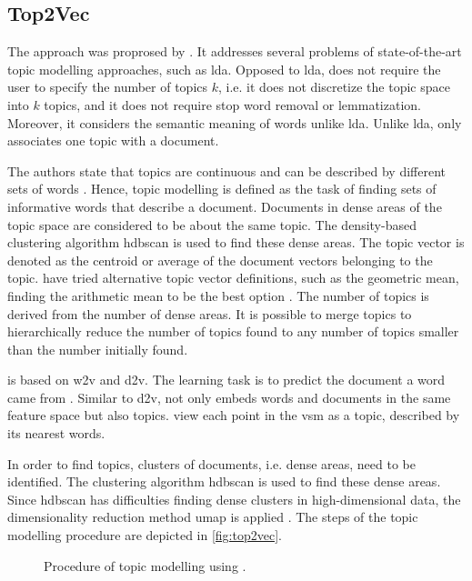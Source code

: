 \subsection{Top2Vec}\label{subsec:top2vec}

The approach \topTwovec{} was proprosed by \citeauthor{Top2Vec2020} \cite{Top2Vec2020}.
It addresses several problems of state-of-the-art topic modelling approaches, such as \ac{lda}.
Opposed to \ac{lda}, \topTwovec{} does not require the user to specify the number of topics $k$, 
i.e. it does not discretize the topic space into $k$ topics, 
and it does not require stop word removal or lemmatization.
Moreover, it considers the semantic meaning of words unlike \ac{lda}.
Unlike \ac{lda}, \topTwovec{} only associates one topic with a document.

The authors state that topics are continuous and can be described by different sets of words \cite{Top2Vec2020}.
Hence, topic modelling is defined as the task of finding sets of informative words that describe a document.
Documents in dense areas of the topic space are considered to be about the same topic.
The density-based clustering algorithm \ac{hdbscan} is used to find these dense areas.
The topic vector is denoted as the centroid or average of the document vectors belonging to the topic.
\citeauthor{Top2Vec2020} have tried alternative topic vector definitions, such as the geometric mean, finding the arithmetic mean to be the best option \cite{Top2Vec2020}.
The number of topics is derived from the number of dense areas.
It is possible to merge topics to hierarchically reduce the number of topics found to any number of topics smaller than the number initially found.

\topTwovec{} is based on \ac{w2v} and \ac{d2v}.
The learning task is to predict the document a word came from \cite{Top2Vec2020}.
Similar to \ac{d2v}, \topTwovec{} not only embeds words and documents in the same feature space but also topics.
\citeauthor{Top2Vec2020} view each point in the \ac{vsm} as a topic, described by its nearest words.

In order to find topics, clusters of documents, i.e. dense areas, need to be identified.
The clustering algorithm \ac{hdbscan} is used to find these dense areas.
Since \ac{hdbscan} has difficulties finding dense clusters in high-dimensional data, 
the dimensionality reduction method \ac{umap} is applied \cite{Top2Vec2020}.
The steps of the topic modelling procedure \topTwovec{} are depicted in \autoref{fig:top2vec}.

\begin{figure}[htp] %
    \centering
    
    \caption{Procedure of topic modelling using \topTwovec{}.}
    \label{fig:top2vec}
\end{figure}